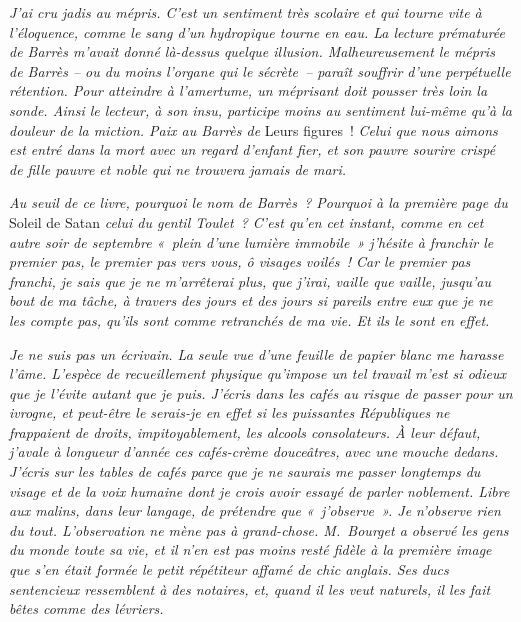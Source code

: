 \documentclass[french,twoside]{book} %
\begin{document}
\par
\emph{J’ai cru jadis au mépris. C’est un sentiment très scolaire et qui tourne vite à l’éloquence, comme le sang d’un hydropique tourne en eau. La lecture prématurée de Barrès m’avait donné là-dessus quelque illusion. Malheureusement le mépris de Barrès – ou du moins l’organe qui le sécrète – paraît souffrir d’une perpétuelle rétention. Pour atteindre à l’amertume, un méprisant doit pousser très loin la sonde. Ainsi le lecteur, à son insu, participe moins au sentiment lui-même qu’à la douleur de la miction. Paix au Barrès de} Leurs figures ! \emph{Celui que nous aimons est entré dans la mort avec un regard d’enfant fier, et son pauvre sourire crispé de fille pauvre et noble qui ne trouvera jamais de mari.}\par
\emph{Au seuil de ce livre, pourquoi le nom de Barrès ? Pourquoi à la première page du} Soleil de Satan \emph{celui du gentil Toulet ? C’est qu’en cet instant, comme en cet autre soir de septembre « plein d’une lumière immobile » j’hésite à franchir le premier pas, le premier pas vers vous, ô visages voilés ! Car le premier pas franchi, je sais que je ne m’arrêterai plus, que j’irai, vaille que vaille, jusqu’au bout de ma tâche, à travers des jours et des jours si pareils entre eux que je ne les compte pas, qu’ils sont comme retranchés de ma vie. Et ils le sont en effet.}\par
{\itshape Je ne suis pas un écrivain. La seule vue d’une feuille de papier blanc me harasse l’âme. L’espèce de recueillement physique qu’impose un tel travail m’est si odieux que je l’évite autant que je puis. J’écris dans les cafés au risque de passer pour un ivrogne, et peut-être le serais-je en effet si les puissantes Républiques ne frappaient de droits, impitoyablement, les alcools consolateurs. À leur défaut, j’avale à longueur d’année ces cafés-crème douceâtres, avec une mouche dedans. J’écris sur les tables de cafés parce que je ne saurais me passer longtemps du visage et de la voix humaine dont je crois avoir essayé de parler noblement. Libre aux malins, dans leur langage, de prétendre que « j’observe ». Je n’observe rien du tout. L’observation ne mène pas à grand-chose. M. Bourget a observé les gens du monde toute sa vie, et il n’en est pas moins resté fidèle à la première image que s’en était formée le petit répétiteur affamé de chic anglais. Ses ducs sentencieux ressemblent à des notaires, et, quand il les veut naturels, il les fait bêtes comme des lévriers.}\par
\end{document}
